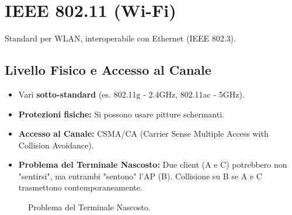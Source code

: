 \section{IEEE 802.11 (Wi-Fi)}
Standard per WLAN, interoperabile con Ethernet (IEEE 802.3).

\subsection{Livello Fisico e Accesso al Canale}
\begin{itemize}
    \item Vari \textbf{sotto-standard} (es. 802.11g - 2.4GHz, 802.11ac - 5GHz).
    \item \textbf{Protezioni fisiche:} Si possono usare pitture schermanti.
    \item \textbf{Accesso al Canale:} CSMA/CA (Carrier Sense Multiple Access with Collision Avoidance).
    \item \textbf{Problema del Terminale Nascosto:} Due client (A e C) potrebbero non "sentirsi", ma entrambi "sentono" l'AP (B). Collisione su B se A e C trasmettono contemporaneamente.
\end{itemize}
\begin{figure}[H]
    \centering
    \caption{Problema del Terminale Nascosto.}
    \label{fig:hidden_terminal}
\end{figure}

